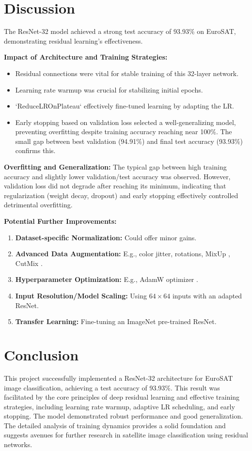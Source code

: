 \documentclass[11pt, a4paper]{article}
\begin{document}
\clearpage %
\section{Discussion}
The ResNet-32 model achieved a strong test accuracy of 93.93\% on EuroSAT, demonstrating residual learning's effectiveness.

\textbf{Impact of Architecture and Training Strategies:}
\begin{itemize}[itemsep=0.5em]
    \item Residual connections were vital for stable training of this 32-layer network.
    \item Learning rate warmup was crucial for stabilizing initial epochs.
    \item `ReduceLROnPlateau` effectively fine-tuned learning by adapting the LR.
    \item Early stopping based on validation loss selected a well-generalizing model, preventing overfitting despite training accuracy reaching near 100\%. The small gap between best validation (94.91\%) and final test accuracy (93.93\%) confirms this.
\end{itemize}

\textbf{Overfitting and Generalization:}
The typical gap between high training accuracy and slightly lower validation/test accuracy was observed. However, validation loss did not degrade after reaching its minimum, indicating that regularization (weight decay, dropout) and early stopping effectively controlled detrimental overfitting.

\textbf{Potential Further Improvements:}
\begin{enumerate}[itemsep=0.3em]
    \item \textbf{Dataset-specific Normalization:} Could offer minor gains.
    \item \textbf{Advanced Data Augmentation:} E.g., color jitter, rotations, MixUp \cite{Zhang2018Mixup}, CutMix \cite{Yun2019CutMix}.
    \item \textbf{Hyperparameter Optimization:} E.g., AdamW optimizer \cite{Loshchilov2019AdamW}.
    \item \textbf{Input Resolution/Model Scaling:} Using $64 \times 64$ inputs with an adapted ResNet.
    \item \textbf{Transfer Learning:} Fine-tuning an ImageNet pre-trained ResNet.
\end{enumerate}

\clearpage %
\section{Conclusion}
This project successfully implemented a ResNet-32 architecture for EuroSAT image classification, achieving a test accuracy of 93.93\%. This result was facilitated by the core principles of deep residual learning and effective training strategies, including learning rate warmup, adaptive LR scheduling, and early stopping. The model demonstrated robust performance and good generalization. The detailed analysis of training dynamics provides a solid foundation and suggests avenues for further research in satellite image classification using residual networks.

\clearpage %
\printbibliography
\end{document}
